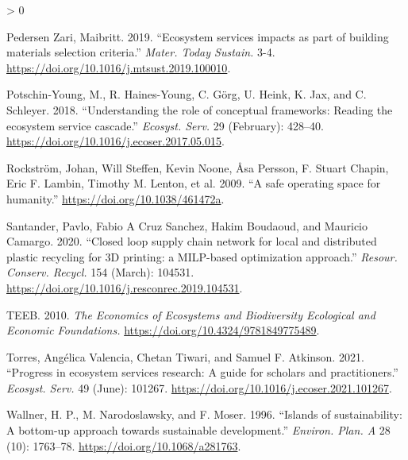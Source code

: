 \documentclass[
  14pt,
]{extarticle}
\newlength{\cslhangindent}
\newenvironment{CSLReferences}[2] %
 {%
  \setlength{\parindent}{0pt}
  \ifodd #1 \everypar{\setlength{\hangindent}{\cslhangindent}}\ignorespaces\fi
  \ifnum #2 > 0
  \setlength{\parskip}{#2\baselineskip}
  \fi
 }%
 {}
\begin{document}
\begin{CSLReferences}{1}{0}
\leavevmode\hypertarget{ref-PedersenZari2019}{}%
Pedersen Zari, Maibritt. 2019. {``{Ecosystem services impacts as part of building materials selection criteria}.''} \emph{Mater. Today Sustain.} 3-4. \url{https://doi.org/10.1016/j.mtsust.2019.100010}.

\leavevmode\hypertarget{ref-Potschin-Young2018}{}%
Potschin-Young, M., R. Haines-Young, C. Görg, U. Heink, K. Jax, and C. Schleyer. 2018. {``{Understanding the role of conceptual frameworks: Reading the ecosystem service cascade}.''} \emph{Ecosyst. Serv.} 29 (February): 428--40. \url{https://doi.org/10.1016/j.ecoser.2017.05.015}.

\leavevmode\hypertarget{ref-Rockstrom2009}{}%
Rockström, Johan, Will Steffen, Kevin Noone, Åsa Persson, F. Stuart Chapin, Eric F. Lambin, Timothy M. Lenton, et al. 2009. {``{A safe operating space for humanity}.''} \url{https://doi.org/10.1038/461472a}.

\leavevmode\hypertarget{ref-Santander2020}{}%
Santander, Pavlo, Fabio A Cruz Sanchez, Hakim Boudaoud, and Mauricio Camargo. 2020. {``{Closed loop supply chain network for local and distributed plastic recycling for 3D printing: a MILP-based optimization approach}.''} \emph{Resour. Conserv. Recycl.} 154 (March): 104531. \url{https://doi.org/10.1016/j.resconrec.2019.104531}.

\leavevmode\hypertarget{ref-TEEB2010}{}%
TEEB. 2010. \emph{{The Economics of Ecosystems and Biodiversity Ecological and Economic Foundations.}} \url{https://doi.org/10.4324/9781849775489}.

\leavevmode\hypertarget{ref-Torres2021}{}%
Torres, Angélica Valencia, Chetan Tiwari, and Samuel F. Atkinson. 2021. {``{Progress in ecosystem services research: A guide for scholars and practitioners}.''} \emph{Ecosyst. Serv.} 49 (June): 101267. \url{https://doi.org/10.1016/j.ecoser.2021.101267}.

\leavevmode\hypertarget{ref-Wallner1996}{}%
Wallner, H. P., M. Narodoslawsky, and F. Moser. 1996. {``{Islands of sustainability: A bottom-up approach towards sustainable development}.''} \emph{Environ. Plan. A} 28 (10): 1763--78. \url{https://doi.org/10.1068/a281763}.

\end{CSLReferences}
\end{document}
